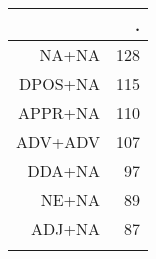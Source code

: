 \begin{tabular}{rr}
  \lsptoprule
 & . \\ 
  \midrule
NA+NA & 128 \\ 
  DPOS+NA & 115 \\ 
  APPR+NA & 110 \\ 
  ADV+ADV & 107 \\ 
  DDA+NA &  97 \\ 
  NE+NA &  89 \\ 
  ADJ+NA &  87 \\ 
   \lspbottomrule
\end{tabular}

